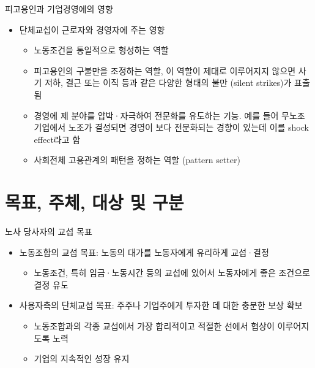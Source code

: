 \documentclass[aspectratio=169,xcolor=dvipsnames,handout]{beamer}
\begin{document}
\begin{frame}{피고용인과 기업경영에의 영향}
    \begin{itemize}[<+->]
        \item 단체교섭이 근로자와 경영자에 주는 영향
        \begin{itemize}[<+->]
            \item 노동조건을 통일적으로 형성하는 역할
            \item 피고용인의 구불만을 조정하는 역할, 이 역할이 제대로 이루어지지 않으면 사기 저하, 결근 또는 이직 등과 같은 다양한 형태의 불만 (silent strikes)가 표출됨
            \item 경영에 제 분야를 압박·자극하여 전문화를 유도하는 기능. 예를 들어 무노조 기업에서 노조가 결성되면 경영이 보다 전문화되는 경향이 있는데 이를 shock effect라고 함
            \item 사회전체 고용관계의 패턴을 정하는 역할 (pattern setter)
        \end{itemize}
    \end{itemize}
\end{frame}

\section{목표, 주체, 대상 및 구분}

\begin{frame}{노사 당사자의 교섭 목표}
    \begin{itemize}[<+->]
        \item 노동조합의 교섭 목표: 노동의 대가를 노동자에게 유리하게 교섭·결정
        \begin{itemize}[<+->]
            \item 노동조건, 특히 임금·노동시간 등의 교섭에 있어서 노동자에게 좋은 조건으로 결정 유도
        \end{itemize}
            \item 사용자측의 단체교섭 목표: 주주나 기업주에게 투자한 데 대한 충분한 보상 확보
        \begin{itemize}[<+->]
            \item 노동조합과의 각종 교섭에서 가장 합리적이고 적절한 선에서 협상이 이루어지도록 노력
            \item 기업의 지속적인 성장 유지
        \end{itemize}
    \end{itemize}
\end{frame}
\end{document}
